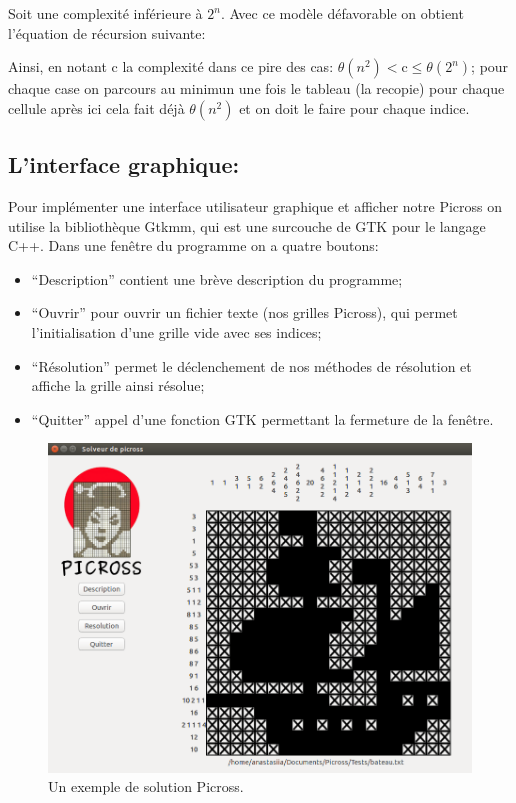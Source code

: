 \documentclass{article}
\begin{document}
Soit une complexité inférieure à $2^n$.
\newline
Avec ce modèle défavorable on obtient l'équation de récursion suivante:
\begin{center}
\end{center}
Ainsi, en notant c la complexité dans ce pire des cas: $\theta(n^2) <$c$\leq\theta(2^n)$; pour chaque case on parcours au minimun une fois le tableau (la recopie) pour chaque cellule après ici cela fait déjà $\theta(n^2)$ et on doit le faire pour chaque indice.
\subsection{L'interface graphique:}
Pour implémenter une interface utilisateur graphique et afficher notre Picross on utilise la bibliothèque Gtkmm, qui est une surcouche de GTK pour le langage C++.
Dans une fenêtre du programme on a quatre boutons:
\begin{itemize}
\item  ``Description'' contient une brève description du programme;
\item ``Ouvrir'' pour ouvrir un fichier texte (nos grilles Picross), qui permet l'initialisation d'une grille vide avec ses indices;
\item ``Résolution'' permet le déclenchement de nos méthodes de résolution et affiche la grille ainsi résolue;
\item ``Quitter'' appel d'une fonction GTK permettant la fermeture de la fenêtre.
\end{itemize}
\begin{landscape}
\begin{figure}
\begin{center}
\includegraphics[width=15cm]{picross}
\end{center}
\caption{Un exemple de solution Picross.}
\end{figure}
\end{landscape}
\end{document}
